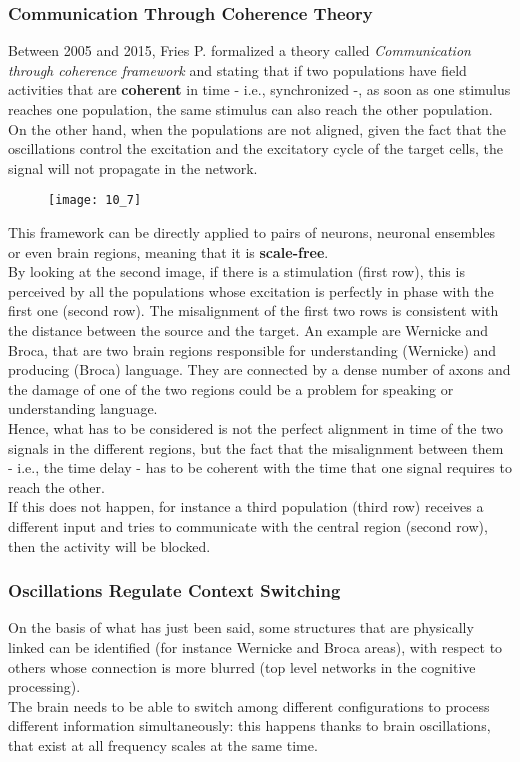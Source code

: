 \subsubsection{Communication Through Coherence Theory}
Between 2005 and 2015, Fries P. formalized a theory called \textit{Communication through
coherence framework} and stating that if two populations have field activities that are
\textbf{coherent} in time - i.e., synchronized -, as soon as one stimulus reaches one population,
the same stimulus can also reach the other population. On the other hand, when the populations
are not aligned, given the fact that the oscillations control the excitation and the
excitatory cycle of the target cells, the signal will not propagate in the network.
\begin{figure}[H]
    \texttt{[image: 10\_7]}
    \centering
\end{figure}
This framework can be directly applied to pairs of neurons, neuronal ensembles or even brain
regions, meaning that it is \textbf{scale-free}.\\
By looking at the second image, if there is a stimulation (first row), this is perceived by
all the populations whose excitation is perfectly in phase with the first one (second row).
The misalignment of the first two rows is consistent with the distance between the source and the
target. An example are Wernicke and Broca, that are two brain regions responsible for
understanding (Wernicke) and producing (Broca) language. They are connected by a
dense number of axons and the damage of one of the two regions could be a problem for
speaking or understanding language.\\
Hence, what has to be considered is not the perfect alignment in time of the two signals in
the different regions, but the fact that the misalignment between them - i.e., the time delay -
has to be coherent with the time that one signal requires to reach the other.\\
If this does not happen, for instance a third population (third row) receives a different
input and tries to communicate with the central region (second row), then the activity will
be blocked.
\subsubsection{Oscillations Regulate Context Switching}
On the basis of what has just been said, some structures that are physically linked can be
identified (for instance Wernicke and Broca areas), with respect to others whose
connection is more blurred (top level networks in the cognitive processing).\\
The brain needs to be able to switch among different configurations to process different
information simultaneously: this happens thanks to brain oscillations, that exist at all
frequency scales at the same time.
